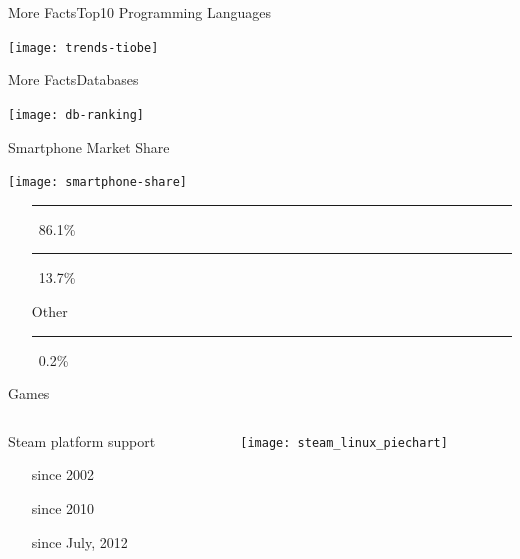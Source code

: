 \begin{frame}{More Facts}{Top10 Programming Languages}
  \begin{center}
    \texttt{[image: trends-tiobe]}
  \end{center}
  \vfill {}
\end{frame}

\begin{frame}{More Facts}{Databases}
  \begin{center}
    \texttt{[image: db-ranking]}
  \end{center}
  \vfill
\end{frame}

\begin{frame}{Smartphone Market Share}
  \begin{center}
    \texttt{[image: smartphone-share]}
  \end{center}
  {\footnotesize
  \begin{itemize}
  \item[\android] \textcolor{Green}{\rule{.8\textwidth}{2mm}}\, 86.1\%
  \item[\apple] \textcolor{LightGray}{\rule{.137\textwidth}{2mm}}\, 13.7\%
  \item[Other] \textcolor{gray}{\rule{.002\textwidth}{2mm}}\, 0.2\%
  \end{itemize}}
\end{frame}

\begin{frame}{Games}
  \begin{columns}
    \begin{column}{.5\textwidth}
      \begin{block}{Steam platform support}
        \begin{itemize}
        \item[\win] since 2002
        \item[\apple] since 2010
        \item[\linux] since July, 2012
        \end{itemize}
      \end{block}
    \end{column}
    \begin{column}{.5\textwidth}
      \texttt{[image: steam\_linux\_piechart]}      
    \end{column}
  \end{columns}
\end{frame}

